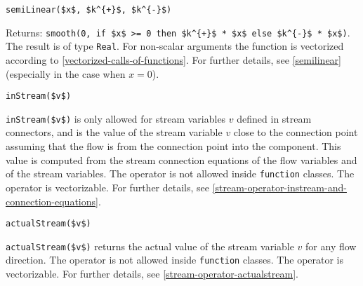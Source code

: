 \begin{operatordefinition}[semiLinear]
\begin{synopsis}\begin{lstlisting}
semiLinear($x$, $k^{+}$, $k^{-}$)
\end{lstlisting}\end{synopsis}
\begin{semantics}
Returns: \lstinline!smooth(0, if $x$ >= 0 then $k^{+}$ * $x$ else $k^{-}$ * $x$)!.
The result is of type \lstinline!Real!.
For non-scalar arguments the function is vectorized according to \cref{vectorized-calls-of-functions}.
For further details, see \cref{semilinear} (especially in the case when $x = 0$).
\end{semantics}
\end{operatordefinition}

\begin{operatordefinition}[inStream]
\begin{synopsis}\begin{lstlisting}
inStream($v$)
\end{lstlisting}\end{synopsis}
\begin{semantics}
\lstinline!inStream($v$)! is only allowed for stream variables $v$ defined in stream connectors, and is the value of the stream variable $v$ close to the connection point assuming that the flow is from the connection point into the component.
This value is computed from the stream connection equations of the flow variables and of the stream variables.
The operator is not allowed inside \lstinline!function! classes.
The operator is vectorizable.
For further details, see \cref{stream-operator-instream-and-connection-equations}.
\end{semantics}
\end{operatordefinition}

\begin{operatordefinition}[actualStream]
\begin{synopsis}\begin{lstlisting}
actualStream($v$)
\end{lstlisting}\end{synopsis}
\begin{semantics}
\lstinline!actualStream($v$)! returns the actual value of the stream variable $v$ for any flow direction.
The operator is not allowed inside \lstinline!function! classes.
The operator is vectorizable.
For further details, see \cref{stream-operator-actualstream}.
\end{semantics}
\end{operatordefinition}

